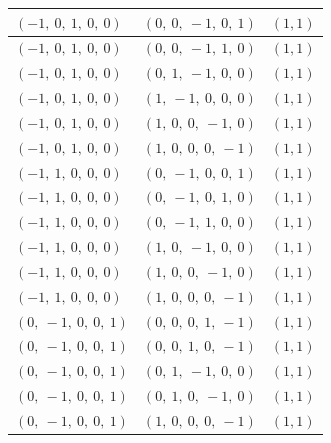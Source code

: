 \documentclass[11pt]{article}
\theoremstyle{definition}
\begin{document}
\begin{tabular}{|l|l|c|}
    \hline
    $\left( -1, \  0, \  1, \  0, \  0\right)$ & $\left( 0, \  0, \  -1, \  0, \  1\right)$ & $(1,1)$ \\
    \hline
    $\left( -1, \  0, \  1, \  0, \  0\right)$ & $\left( 0, \  0, \  -1, \  1, \  0\right)$ & $(1,1)$ \\
    \hline
    $\left( -1, \  0, \  1, \  0, \  0\right)$ & $\left( 0, \  1, \  -1, \  0, \  0\right)$ & $(1,1)$ \\
    \hline
    $\left( -1, \  0, \  1, \  0, \  0\right)$ & $\left( 1, \  -1, \  0, \  0, \  0\right)$ & $(1,1)$ \\
    \hline
    $\left( -1, \  0, \  1, \  0, \  0\right)$ & $\left( 1, \  0, \  0, \  -1, \  0\right)$ & $(1,1)$ \\
    \hline
    $\left( -1, \  0, \  1, \  0, \  0\right)$ & $\left( 1, \  0, \  0, \  0, \  -1\right)$ & $(1,1)$ \\
    \hline
    $\left( -1, \  1, \  0, \  0, \  0\right)$ & $\left( 0, \  -1, \  0, \  0, \  1\right)$ & $(1,1)$ \\
    \hline
    $\left( -1, \  1, \  0, \  0, \  0\right)$ & $\left( 0, \  -1, \  0, \  1, \  0\right)$ & $(1,1)$ \\
    \hline
    $\left( -1, \  1, \  0, \  0, \  0\right)$ & $\left( 0, \  -1, \  1, \  0, \  0\right)$ & $(1,1)$ \\
    \hline
    $\left( -1, \  1, \  0, \  0, \  0\right)$ & $\left( 1, \  0, \  -1, \  0, \  0\right)$ & $(1,1)$ \\
    \hline
    $\left( -1, \  1, \  0, \  0, \  0\right)$ & $\left( 1, \  0, \  0, \  -1, \  0\right)$ & $(1,1)$ \\
    \hline
    $\left( -1, \  1, \  0, \  0, \  0\right)$ & $\left( 1, \  0, \  0, \  0, \  -1\right)$ & $(1,1)$ \\
    \hline
    $\left( 0, \  -1, \  0, \  0, \  1\right)$ & $\left( 0, \  0, \  0, \  1, \  -1\right)$ & $(1,1)$ \\
    \hline
    $\left( 0, \  -1, \  0, \  0, \  1\right)$ & $\left( 0, \  0, \  1, \  0, \  -1\right)$ & $(1,1)$ \\
    \hline
    $\left( 0, \  -1, \  0, \  0, \  1\right)$ & $\left( 0, \  1, \  -1, \  0, \  0\right)$ & $(1,1)$ \\
    \hline
    $\left( 0, \  -1, \  0, \  0, \  1\right)$ & $\left( 0, \  1, \  0, \  -1, \  0\right)$ & $(1,1)$ \\
    \hline
    $\left( 0, \  -1, \  0, \  0, \  1\right)$ & $\left( 1, \  0, \  0, \  0, \  -1\right)$ & $(1,1)$ \\

\end{tabular}
\end{document}
